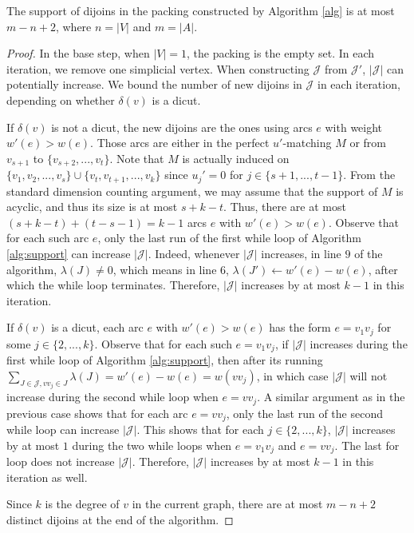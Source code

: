 \documentclass[runningheads]{llncs}
\begin{document}
\begin{lemma}\label{lemma:support}
    The support of dijoins in the packing constructed by Algorithm \ref{alg} is at most $m-n+2$, where $n=|V|$ and $m=|A|$.
\end{lemma}
\begin{proof}
     In the base step, when $|V|=1$, the packing is the empty set. In each iteration, we remove one simplicial vertex. When constructing $\mathcal{J}$ from $\mathcal{J}'$, $|\mathcal{J}|$ can potentially increase. We bound the number of new dijoins in $\mathcal{J}$ in each iteration, depending on whether $\delta(v)$ is a dicut. 
     
     If $\delta(v)$ is not a dicut, the new dijoins are the ones using arcs $e$ with weight $w'(e)>w(e)$. Those arcs are either in the perfect $u'$-matching $M$ or from $v_{s+1}$ to $\{v_{s+2},...,v_t\}$. Note that $M$ is actually induced on $\{v_1,v_2,...,v_s\}\cup \{v_t,v_{t+1},...,v_k\}$ since $u_j'=0$ for $j\in \{s+1,...,t-1\}$. From the standard dimension counting argument, we may assume that the support of $M$ is acyclic, and thus its size is at most $s+k-t$. Thus, there are at most $(s+k-t)+(t-s-1)=k-1$ arcs $e$ with $w'(e)>w(e)$. Observe that for each such arc $e$, only the last run of the first while loop of Algorithm \ref{alg:support} can increase $|\mathcal{J}|$. Indeed, whenever $|\mathcal{J}|$ increases, in line $9$ of the algorithm, $\lambda(J)\neq 0$, which means in line $6$, $\lambda(J')\gets w'(e)-w(e)$, after which the while loop terminates. Therefore, $|\mathcal{J}|$ increases by at most $k-1$ in this iteration. 

     If $\delta(v)$ is a dicut, each arc $e$ with $w'(e)>w(e)$ has the form $e=v_1v_j$ for some $j\in\{2,...,k\}$. Observe that for each such $e=v_1v_j$, if $|\mathcal{J}|$ increases during the first while loop of Algorithm \ref{alg:support}, then after its running $\sum_{J\in\mathcal{J}, vv_j\in J} \lambda(J)=w'(e)-w(e)=w(vv_j)$, in which case $|\mathcal{J}|$ will not increase during the second while loop when $e=vv_j$. A similar argument as in the previous case shows that for each arc $e=vv_j$, only the last run of the second while loop can increase $|\mathcal{J}|$. This shows that for each $j\in\{2,...,k\}$, $|\mathcal{J}|$ increases by at most $1$ during the two while loops when $e=v_1v_j$ and $e=vv_j$. The last for loop does not increase $|\mathcal{J}|$. Therefore, $|\mathcal{J}|$ increases by at most $k-1$ in this iteration as well.
     
     Since $k$ is the degree of $v$ in the current graph, there are at most $m-n+2$ distinct dijoins at the end of the algorithm.
\end{proof}
\end{document}
